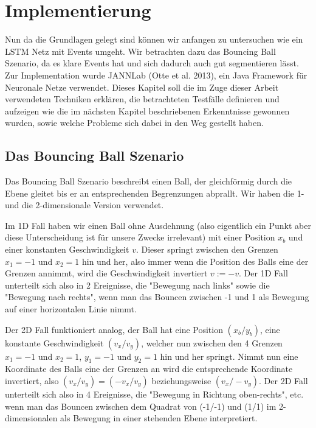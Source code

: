 \chapter{Implementierung}
Nun da die Grundlagen gelegt sind können wir anfangen zu untersuchen wie ein LSTM Netz mit Events umgeht. Wir betrachten dazu das Bouncing Ball Szenario, da es klare Events hat und sich dadurch auch gut segmentieren lässt. Zur Implementation wurde JANNLab (Otte et al. 2013), ein Java Framework für Neuronale Netze verwendet. Dieses Kapitel soll die im Zuge dieser Arbeit verwendeten Techniken erklären, die betrachteten Testfälle definieren und aufzeigen wie die im nächsten Kapitel beschriebenen Erkenntnisse gewonnen wurden, sowie welche Probleme sich dabei in den Weg gestellt haben.

\section{Das Bouncing Ball Szenario}
Das Bouncing Ball Szenario beschreibt einen Ball, der gleichförmig durch die Ebene gleitet bis er an entsprechenden Begrenzungen abprallt. Wir haben die 1- und die 2-dimensionale Version verwendet.

Im 1D Fall haben wir einen Ball ohne Ausdehnung (also eigentlich ein Punkt aber diese Unterscheidung ist für unsere Zwecke irrelevant) mit einer Position $ x_{b} $ und einer konstanten Geschwindigkeit $  v$. Dieser springt zwischen den Grenzen $ x_{1}=-1 $ und $ x_{2}=1 $ hin und her, also immer wenn die Position des Balls eine der Grenzen annimmt, wird die Geschwindigkeit invertiert $ v := -v $. Der 1D Fall unterteilt sich also in 2 Ereignisse, die "Bewegung nach links" sowie die "Bewegung nach rechts", wenn man das Bouncen zwischen -1 und 1 als Bewegung auf einer horizontalen Linie nimmt.

Der 2D Fall funktioniert analog, der Ball hat eine Position $ (x_{b}/y_{b}) $, eine konstante Geschwindigkeit $ (v_{x}/v_{y}) $, welcher nun zwischen den 4 Grenzen $ x_{1}=-1 $ und $ x_{2}=1 $, $ y_{1}=-1 $ und $ y_{2}=1 $ hin und her springt. Nimmt nun eine Koordinate des Balls eine der Grenzen an wird die entsprechende Koordinate invertiert, also $ (v_{x}/v_{y}) = (-v_{x}/v_{y}) $ beziehungsweise $ (v_{x}/-v_{y}) $. Der 2D Fall unterteilt sich also in 4 Ereignisse, die "Bewegung in Richtung oben-rechts", etc. wenn man das Bouncen zwischen dem Quadrat von (-1/-1) und (1/1) im 2-dimensionalen als Bewegung in einer stehenden Ebene interpretiert.

